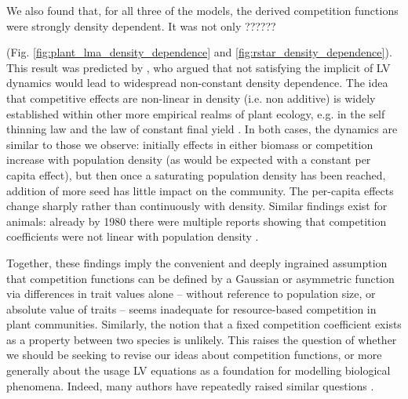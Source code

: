 \documentclass[a4paper,11pt]{article}
\begin{document}
We also found that, for all three of the models, the derived competition functions were strongly density dependent. It was not only ??????


(Fig. \ref{fig:plant_lma_density_dependence} and \ref{fig:rstar_density_dependence}). This result was predicted by \citet{Abrams-1980}, who argued that not satisfying the implicit of LV dynamics would lead to widespread non-constant density dependence. The idea that competitive
effects are non-linear in density (i.e. non additive) is widely established within other more empirical realms of plant ecology, e.g.
in the self thinning law and the law of constant final yield \citep{Harper-1977}.
In both cases, the dynamics are similar to those we observe: initially effects in either biomass or competition increase with population density (as would be expected with a constant per capita effect), but then once a saturating population density has been reached, addition of more seed has little impact on the community. The per-capita effects change sharply rather than continuously with density. Similar findings exist for animals: already by 1980 there were multiple reports showing that competition coefficients were not linear with population density
\citep{Abrams-1980}.

Together, these findings imply the convenient and deeply ingrained assumption that competition functions can be defined by  a Gaussian or asymmetric function via differences in trait values alone -- without reference to population size, or absolute value of traits -- seems inadequate for resource-based competition in plant communities. Similarly, the notion that a fixed competition coefficient exists as a property between two species is unlikely. This raises the question of whether we should be seeking to revise our ideas about competition functions, or more generally about the usage LV equations as a foundation for modelling biological phenomena.
Indeed, many authors have repeatedly raised similar questions \citep[e.g.][]{Andrewartha-1953,
  Neill-1974, Abrams-1975, Wangersky-1978,Abrams-1980, Tilman-1987,
  Abrams-2008}.
\end{document}
